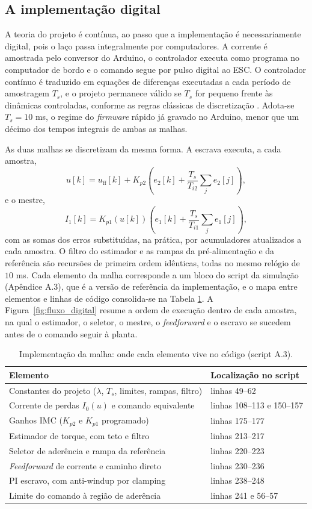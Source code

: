 \subsection{A implementação digital}
\label{sec:implementacao}

A teoria do projeto é contínua, ao passo que a implementação é necessariamente digital, pois o
laço passa integralmente por computadores. A corrente é amostrada pelo conversor do
Arduino, o controlador executa como programa no computador de bordo e o comando segue por
pulso digital ao ESC. O controlador contínuo é traduzido em equações de diferenças
executadas a cada período de amostragem $T_s$, e o projeto permanece válido se $T_s$ for
pequeno frente às dinâmicas controladas, conforme as regras clássicas de discretização
\cite{raffo_tcpi_sintese}. Adota-se $T_s = 10$ ms, o regime do \emph{firmware} rápido já
gravado no Arduino, menor que um décimo dos tempos integrais de ambas as malhas.

As duas malhas se discretizam da mesma forma. A escrava executa, a cada amostra,
\[
u[k] = u_\mathrm{ff}[k] + K_{p2}\left(e_2[k] + \frac{T_s}{T_{i2}}\sum_j e_2[j]\right),
\]
e o mestre,
\[
I_1[k] = K_{p1}(u[k])\left(e_1[k] + \frac{T_s}{T_{i1}}\sum_j e_1[j]\right),
\]
com as somas dos erros substituídas, na prática, por acumuladores atualizados a cada
amostra. O filtro do estimador e as rampas da pré-alimentação e da referência são
recursões de primeira ordem idênticas, todas no mesmo relógio de $10$ ms. Cada elemento da
malha corresponde a um bloco do script da simulação (Apêndice A.3), que é a versão de
referência da implementação, e o mapa entre elementos e linhas de
código consolida-se na Tabela \ref{tab:implementacao}. A
Figura~\ref{fig:fluxo_digital} resume a ordem de execução dentro de cada amostra, na
qual o estimador, o seletor, o mestre, o \emph{feedforward} e o escravo se sucedem
antes de o comando seguir à planta.

\begin{table}[htb]
\centering
\caption{Implementação da malha: onde cada elemento vive no código (script A.3).}
\label{tab:implementacao}
\small
\renewcommand{\arraystretch}{1.2}
\begin{tabular}{l l}
\hline
Elemento & Localização no script \\
\hline
Constantes do projeto ($\lambda$, $T_s$, limites, rampas, filtro) & linhas 49--62 \\
Corrente de perdas $I_0(u)$ e comando equivalente & linhas 108--113 e 150--157 \\
Ganhos IMC ($K_{p2}$ e $K_{p1}$ programado) & linhas 175--177 \\
Estimador de torque, com teto e filtro & linhas 213--217 \\
Seletor de aderência e rampa da referência & linhas 220--223 \\
\emph{Feedforward} de corrente e caminho direto & linhas 230--236 \\
PI escravo, com anti-windup por clamping & linhas 238--248 \\
Limite do comando à região de aderência & linhas 241 e 56--57 \\
\hline
\end{tabular}
\end{table}

